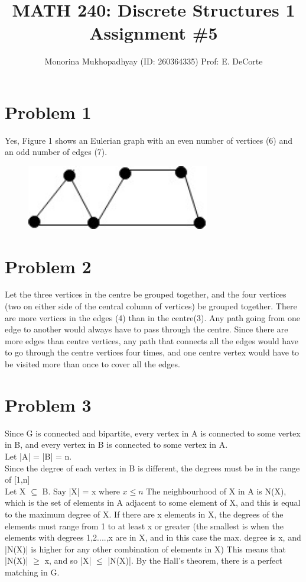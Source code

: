 \documentclass[english]{article}
\title{MATH 240: Discrete Structures 1 Assignment \#5}
\author{Monorina Mukhopadhyay (ID: 260364335) Prof: E. DeCorte}
\begin{document}
\maketitle
\section*{Problem 1}
Yes, Figure 1 shows an Eulerian graph with an even number of vertices (6) and an odd number of edges (7).
\begin{figure}[h]
\includegraphics[width=8cm]{Q1.jpg}
\end{figure}
\section*{Problem 2}
 Let the three vertices in the centre be grouped together, and the four vertices (two on either side of the central column of vertices) be grouped together. There are more vertices in the edges (4) than in the centre(3). Any path going from one edge to another would always have to pass through the centre. Since there are more edges than centre vertices, any path that connects all the edges would have to go through the centre vertices four times, and one centre vertex would have to be visited more than once to cover all the edges.
\section*{Problem 3}
Since G is connected and bipartite, every vertex in A is connected to some vertex in B, and every vertex in B is connected to some vertex in A. 
\\ Let |A| = |B| = n. 
\\ Since the degree of each vertex in B is different, the degrees must be in the range of [1,n]
\\ Let X $\subseteq$ B. Say |X| = x where $x \leq n$ The neighbourhood of X in A is N(X), which is the set of elements in A adjacent to some element of X, and this is equal to the maximum degree of X. If there are x elements in X, the degrees of the elements must range from 1 to at least x or greater (the smallest is when the elements with degrees 1,2....,x are in X, and in this case the max. degree is x, and |N(X)| is higher for any other combination of elements in X) This means that |N(X)| $\geq$ x, and so |X| $\leq$ |N(X)|. By the Hall's theorem, there is a perfect matching in G. 
\end{document}
